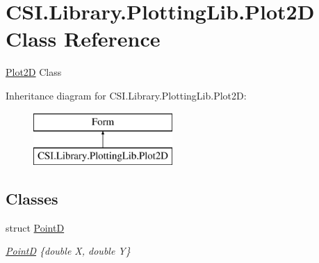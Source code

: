 \hypertarget{class_c_s_i_1_1_library_1_1_plotting_lib_1_1_plot2_d}{}\section{C\+S\+I.\+Library.\+Plotting\+Lib.\+Plot2D Class Reference}
\label{class_c_s_i_1_1_library_1_1_plotting_lib_1_1_plot2_d}


\mbox{\hyperlink{class_c_s_i_1_1_library_1_1_plotting_lib_1_1_plot2_d}{Plot2D}} Class  


Inheritance diagram for C\+S\+I.\+Library.\+Plotting\+Lib.\+Plot2D\+:\begin{figure}[H]
\begin{center}
\leavevmode
\includegraphics[height=2.000000cm]{class_c_s_i_1_1_library_1_1_plotting_lib_1_1_plot2_d}
\end{center}
\end{figure}
\subsection*{Classes}
\begin{DoxyCompactItemize}
\item 
struct \mbox{\hyperlink{struct_c_s_i_1_1_library_1_1_plotting_lib_1_1_plot2_d_1_1_point_d}{PointD}}
\begin{DoxyCompactList}\small\item\em \mbox{\hyperlink{struct_c_s_i_1_1_library_1_1_plotting_lib_1_1_plot2_d_1_1_point_d}{PointD}} \{double X, double Y\} \end{DoxyCompactList}\end{DoxyCompactItemize}
